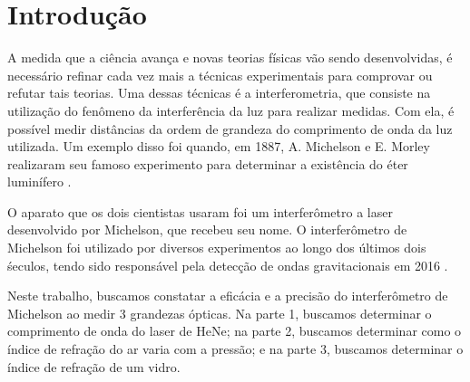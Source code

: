 \section{Introdução}

A medida que a ciência avança e novas teorias físicas vão sendo desenvolvidas, é necessário refinar cada vez mais a técnicas experimentais para comprovar ou refutar tais teorias.
Uma dessas técnicas é a interferometria, que consiste na utilização do fenômeno da interferência da luz para realizar medidas.
Com ela, é possível medir distâncias da ordem de grandeza do comprimento de onda da luz utilizada. 
Um exemplo disso foi quando, em 1887, A. Michelson e E. Morley realizaram seu famoso experimento para determinar a existência do éter luminífero .

O aparato que os dois cientistas usaram foi um interferômetro a laser desenvolvido por Michelson, que recebeu seu nome. 
O interferômetro de Michelson foi utilizado por diversos experimentos ao longo dos últimos dois śeculos, tendo sido responsável pela detecção de ondas gravitacionais em 2016 .

Neste trabalho, buscamos constatar a eficácia e a precisão do interferômetro de Michelson ao medir 3 grandezas ópticas. 
Na parte 1, buscamos determinar o comprimento de onda do laser de HeNe; 
na parte 2, buscamos determinar como o índice de refração do ar varia com a pressão; 
e na parte 3, buscamos determinar o índice de refração de um vidro.
